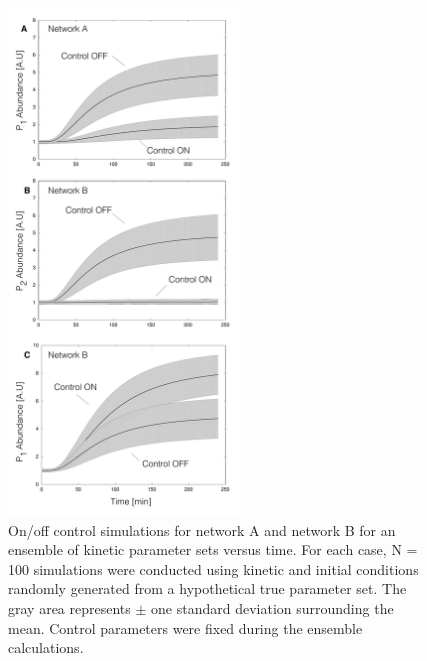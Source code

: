 \documentclass[12pt]{article}
\begin{document}
\clearpage

\begin{figure}
\centering
\includegraphics[width=0.55\textwidth]{./figs/Figure-4-OnOffSimulations.pdf}
\caption{On/off control simulations for network A and network B for an ensemble of kinetic parameter sets versus time. 
For each case, N = 100 simulations were conducted using kinetic and initial conditions randomly generated from a hypothetical true parameter set. 
The gray area represents $\pm$ one standard deviation surrounding the mean. Control parameters were fixed during the ensemble calculations.}\label{fig-onoff-simulations}
\end{figure}

\clearpage
\end{document}
